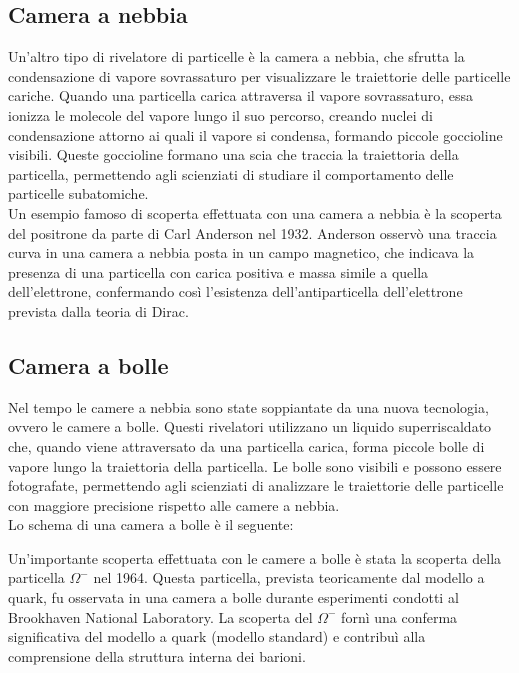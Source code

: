 \subsection{Camera a nebbia}
Un'altro tipo di rivelatore di particelle è la camera a nebbia, che sfrutta la condensazione di vapore sovrassaturo per visualizzare le traiettorie delle particelle cariche. Quando una particella carica attraversa il vapore sovrassaturo, essa ionizza le molecole del vapore lungo il suo percorso, creando nuclei di condensazione attorno ai quali il vapore si condensa, formando piccole goccioline visibili. Queste goccioline formano una scia che traccia la traiettoria della particella, permettendo agli scienziati di studiare il comportamento delle particelle subatomiche.\\
Un esempio famoso di scoperta effettuata con una camera a nebbia è la scoperta del positrone da parte di Carl Anderson nel 1932. Anderson osservò una traccia curva in una camera a nebbia posta in un campo magnetico, che indicava la presenza di una particella con carica positiva e massa simile a quella dell'elettrone, confermando così l'esistenza dell'antiparticella dell'elettrone prevista dalla teoria di Dirac.


\subsection{Camera a bolle}
Nel tempo le camere a nebbia sono state soppiantate da una nuova tecnologia, ovvero le camere a bolle. Questi rivelatori utilizzano un liquido superriscaldato che, quando viene attraversato da una particella carica, forma piccole bolle di vapore lungo la traiettoria della particella. Le bolle sono visibili e possono essere fotografate, permettendo agli scienziati di analizzare le traiettorie delle particelle con maggiore precisione rispetto alle camere a nebbia.\\
Lo schema di una camera a bolle è il seguente:


Un'importante scoperta effettuata con le camere a bolle è stata la scoperta della particella $\Omega^-$ nel 1964. Questa particella, prevista teoricamente dal modello a quark, fu osservata in una camera a bolle durante esperimenti condotti al Brookhaven National Laboratory. La scoperta del $\Omega^-$ fornì una conferma significativa del modello a quark (modello standard) e contribuì alla comprensione della struttura interna dei barioni.

